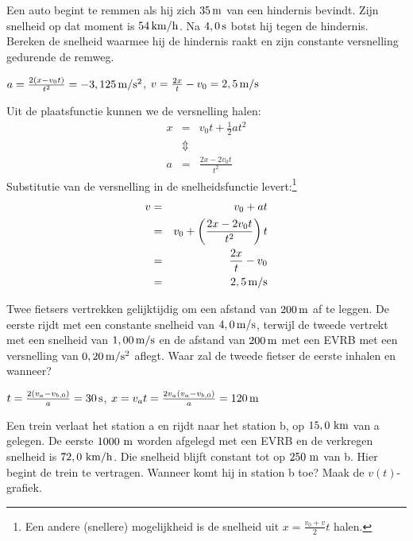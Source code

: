 \documentclass{ximera}
\begin{document}
\begin{exercise}
    Een auto begint te remmen als hij zich $35\rm\,m$ van een hindernis bevindt. Zijn snelheid op dat moment is $54\rm\,km/h$. Na $4,0\rm\,s$ botst hij tegen de hindernis. Bereken de snelheid waarmee hij de hindernis raakt en zijn constante versnelling gedurende de remweg.
\begin{oplossing}
$a=\frac{2(x-v_0t)}{t^2}=-3,125\rm\,m/s^2$, $v=\frac{2x}{t}-v_0=2,5\rm\,m/s$
\end{oplossing}
\begin{oplossing}
Uit de plaatsfunctie kunnen we de versnelling halen:
\begin{eqnarray*}
x&=&v_0t+\frac{1}{2}at^2\\
&\Updownarrow&\\
a&=&\frac{2x-2v_0t}{t^2}
\end{eqnarray*}
Substitutie van de versnelling in de snelheidsfunctie levert:\footnote{Een andere (snellere) mogelijkheid is de snelheid uit $x=\frac{v_0+v}{2}t$ halen.}
\begin{eqnarray*}
v&=&v_0+at\\
&=&v_0+\left(\frac{2x-2v_0t}{t^2}\right)t\\
&=&\frac{2x}{t}-v_0\\
&=&2,5\rm\,m/s
\end{eqnarray*}
\end{oplossing}
\end{exercise}

\begin{exercise}
    Twee fietsers vertrekken gelijktijdig om
een afstand van $200\rm\,m$ af te leggen. De eerste rijdt met een
constante snelheid van $4,0\rm\,m/s$, terwijl de tweede vertrekt met
een snelheid van $1,00\rm\,m/s$ en de afstand van $200\rm\,m$ met
een EVRB met een versnelling van $0,20\rm\,m/s^2$ aflegt. Waar zal
de tweede fietser de eerste inhalen en wanneer?
\begin{oplossing}
    $t=\frac{2(v_a-v_{b,0})}{a}=30\rm\,s$,
    $x=v_at=\frac{2v_a(v_a-v_{b,0})}{a}=120\rm\,m$
\end{oplossing}
\end{exercise}

\begin{exercise}
        Een trein verlaat het station a en rijdt
naar het station b, op $15,0~\rm km$ van a gelegen. De eerste
$1000~\rm m$ worden afgelegd met een EVRB en de verkregen snelheid
is $72,0~\rm km/h$. Die snelheid blijft constant tot op $250~\rm m$
van b. Hier begint de trein te vertragen. Wanneer komt hij in
station b toe? Maak de $v(t)$-grafiek.
\end{exercise}
\end{document}
